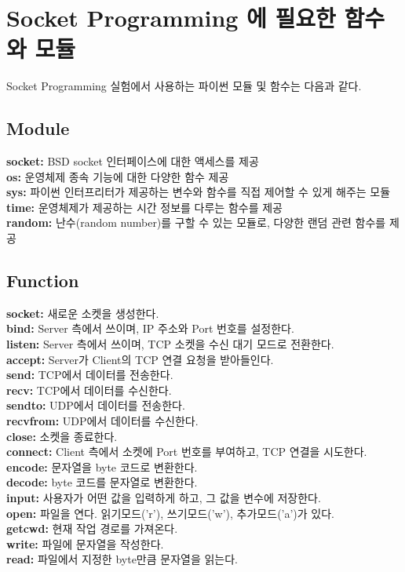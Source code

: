 \section{Socket Programming 에 필요한 함수와 모듈}
Socket Programming 실험에서 사용하는 파이썬 모듈 및 함수는 다음과 같다.
\subsection{Module}
    \textbf{socket:} BSD socket 인터페이스에 대한 액세스를 제공 \\
    \textbf{os:} 운영체제 종속 기능에 대한 다양한 함수 제공 \\
    \textbf{sys:} 파이썬 인터프리터가 제공하는 변수와 함수를 직접 제어할 수 있게 해주는 모듈 \\
    \textbf{time:} 운영체제가 제공하는 시간 정보를 다루는 함수를 제공 \\
    \textbf{random:} 난수(random number)를 구할 수 있는 모듈로, 다양한 랜덤 관련 함수를 제공 \\
\subsection{Function}
    \textbf{socket:} 새로운 소켓을 생성한다. \\
    \textbf{bind:} Server 측에서 쓰이며, IP 주소와 Port 번호를 설정한다. \\
    \textbf{listen:} Server 측에서 쓰이며, TCP 소켓을 수신 대기 모드로 전환한다. \\
    \textbf{accept:} Server가 Client의 TCP 연결 요청을 받아들인다. \\
    \textbf{send:} TCP에서 데이터를 전송한다. \\
    \textbf{recv:} TCP에서 데이터를 수신한다. \\
    \textbf{sendto:} UDP에서 데이터를 전송한다. \\
    \textbf{recvfrom:} UDP에서 데이터를 수신한다. \\
    \textbf{close:} 소켓을 종료한다. \\
    \textbf{connect:} Client 측에서 소켓에 Port 번호를 부여하고, TCP 연결을 시도한다. \\
    \textbf{encode:} 문자열을 byte 코드로 변환한다. \\
    \textbf{decode:} byte 코드를 문자열로 변환한다. \\
    \textbf{input:} 사용자가 어떤 값을 입력하게 하고, 그 값을 변수에 저장한다. \\
    \textbf{open:} 파일을 연다. 읽기모드(’r’), 쓰기모드(’w’), 추가모드(’a’)가 있다. \\
    \textbf{getcwd:} 현재 작업 경로를 가져온다. \\
    \textbf{write:} 파일에 문자열을 작성한다. \\
    \textbf{read:} 파일에서 지정한 byte만큼 문자열을 읽는다. \\
\newpage